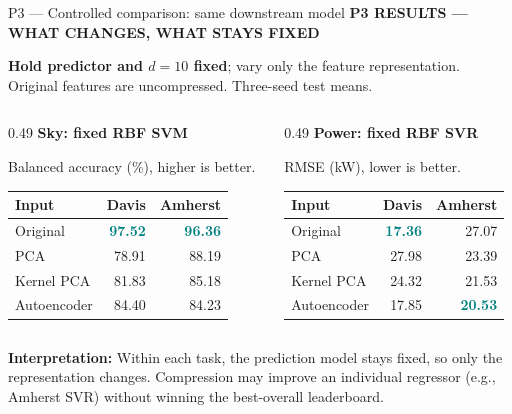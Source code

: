 \documentclass[aspectratio=169,11pt]{beamer}
\newcommand{\sectiontag}[1]{{\footnotesize\usebeamercolor[fg]{structure}\textbf{#1}}\par\vspace{0.10cm}}
\newcommand{\smallmuted}[1]{{\footnotesize\color{slate}#1\par}}
\begin{document}
\begin{frame}{P3 — Controlled comparison: same downstream model}
\sectiontag{P3 \quad RESULTS — WHAT CHANGES, WHAT STAYS FIXED}
\smallmuted{\textbf{Hold predictor and $d=10$ fixed}; vary only the feature representation. Original features are uncompressed. Three-seed test means.}
\vspace{0.20cm}
\begin{columns}[T,totalwidth=\textwidth]
\begin{column}{0.49\textwidth}
\textbf{Sky: fixed RBF SVM}\par\smallmuted{Balanced accuracy (\%), higher is better.}
{\footnotesize\setlength{\tabcolsep}{5.0pt}\renewcommand{\arraystretch}{1.35}
\begin{tabular}{@{}lrr@{}}\toprule
\textbf{Input} & \textbf{Davis} & \textbf{Amherst}\\\midrule
Original & \textcolor{teal}{\textbf{97.52}} & \textcolor{teal}{\textbf{96.36}}\\
PCA & 78.91 & 88.19\\
Kernel PCA & 81.83 & 85.18\\
Autoencoder & 84.40 & 84.23\\
\bottomrule\end{tabular}}
\end{column}
\begin{column}{0.49\textwidth}
\textbf{Power: fixed RBF SVR}\par\smallmuted{RMSE (kW), lower is better.}
{\footnotesize\setlength{\tabcolsep}{5.0pt}\renewcommand{\arraystretch}{1.35}
\begin{tabular}{@{}lrr@{}}\toprule
\textbf{Input} & \textbf{Davis} & \textbf{Amherst}\\\midrule
Original & \textcolor{teal}{\textbf{17.36}} & 27.07\\
PCA & 27.98 & 23.39\\
Kernel PCA & 24.32 & 21.53\\
Autoencoder & 17.85 & \textcolor{teal}{\textbf{20.53}}\\
\bottomrule\end{tabular}}
\end{column}
\end{columns}
\vspace{0.06cm}
\smallmuted{\textbf{Interpretation:} Within each task, the prediction model stays fixed, so only the representation changes. Compression may improve an individual regressor (e.g., Amherst SVR) without winning the best-overall leaderboard.}
\end{frame}
\end{document}
